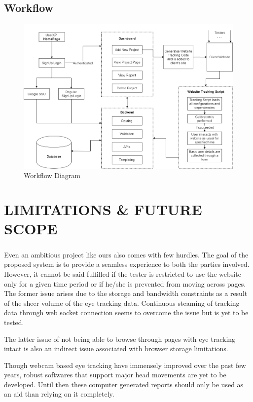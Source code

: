 \documentclass[hidelinks,12pt,a4paper,final]{extreport}
\begin{document}
\section{Workflow}
\begin{figure}[H]
    \centering
    \includegraphics[width=\linewidth]{userXP- Workflow.png}
    \caption{Workflow Diagram}
\end{figure}
\newpage
\chapter{LIMITATIONS \& FUTURE SCOPE}
\paragraph{}
Even an ambitious project like ours also comes with few hurdles. The goal of the proposed system is to provide a seamless experience to both the parties involved. However, it cannot be said fulfilled if the tester is restricted to use the website only for a given time period or if he/she is prevented from moving across pages. The former issue arises due to the storage and bandwidth constraints as a result of the sheer volume of the eye tracking data. Continuous steaming of tracking data through web socket connection seems to overcome the issue but is yet to be tested. 

The latter issue of not being able to browse through pages with eye tracking intact is also an indirect issue associated with browser storage limitations. 

Though webcam based eye tracking have immensely improved over the past few years, robust softwares that support major head movements are yet to be developed. Until then these computer generated reports should only be used as an aid than relying on it completely.
\end{document}
